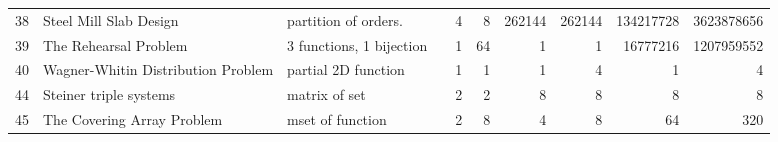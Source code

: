\begin{sidewaystable}
\begin{center}
\begin{tabular}{r|l|l|l|r|r|r|r|r|r}
 38     &   Steel Mill Slab Design                                          &   partition of orders.                                                                                      &   \cite{frisch2001symmetry, gargani-refalo-steelmill}                  & 4                & 8                & 262144                                               & 262144                                & 134217728                                                   & 3623878656                                                  \\
 39     &   The Rehearsal Problem                                           &   3 functions, 1 bijection                                                                                  &   \cite{smith2003constraint}                                           & 1                & 64               & 1                                                    & 1                                     & 16777216                                                    & 1207959552                                                  \\
 40     &   Wagner-Whitin Distribution Problem                              &   partial 2D function                                                                                       &   \cite{tarim2004echelon, tarim2004echelon}                            & 1                & 1                & 1                                                    & 4                                     & 1                                                           & 4                                                           \\
 44     &   Steiner triple systems                                          &   matrix of set                                                                                             &   \cite{colbourn1983embedding}                                         & 2                & 2                & 8                                                    & 8                                     & 8                                                           & 8                                                           \\
 45     &   The Covering Array Problem                                      &   mset of function                                                                                          &   \cite{hnich2006constraint}                                           & 2                & 8                & 4                                                    & 8                                     & 64                                                          & 320                                                         \\

\end{tabular}
\end{center}
\end{sidewaystable}
